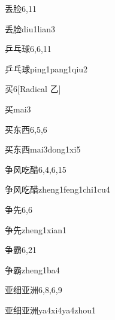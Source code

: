 \begin{entry}{丢脸}{6,11}
  \begin{phonetics}{丢脸}{diu1lian3}
  \end{phonetics}
\end{entry}

\begin{entry}{乒乓球}{6,6,11}
  \begin{phonetics}{乒乓球}{ping1pang1qiu2}
  \end{phonetics}
\end{entry}

\begin{entry}{买}{6}[Radical 乙]
  \begin{phonetics}{买}{mai3}
  \end{phonetics}
\end{entry}

\begin{entry}{买东西}{6,5,6}
  \begin{phonetics}{买东西}{mai3dong1xi5}
  \end{phonetics}
\end{entry}

\begin{entry}{争风吃醋}{6,4,6,15}
  \begin{phonetics}{争风吃醋}{zheng1feng1chi1cu4}
  \end{phonetics}
\end{entry}

\begin{entry}{争先}{6,6}
  \begin{phonetics}{争先}{zheng1xian1}
  \end{phonetics}
\end{entry}

\begin{entry}{争霸}{6,21}
  \begin{phonetics}{争霸}{zheng1ba4}
  \end{phonetics}
\end{entry}

\begin{entry}{亚细亚洲}{6,8,6,9}
  \begin{phonetics}{亚细亚洲}{ya4xi4ya4zhou1}
  \end{phonetics}
\end{entry}

